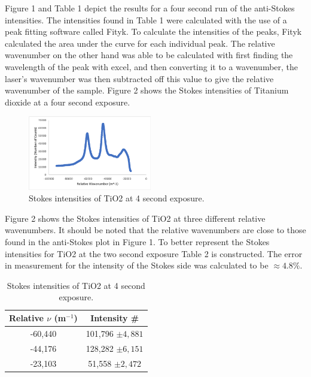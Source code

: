 \documentclass[twocolumn]{article}
\begin{document}
\newline
Figure 1 and Table 1 depict the results for a four second run of the anti-Stokes intensities. The intensities found in Table 1 were calculated with the use of a peak fitting software called Fityk. To calculate the intensities of the peaks, Fityk calculated the area under the curve for each individual peak. The relative wavenumber on the other hand was able to be calculated with first finding the wavelength of the peak with excel, and then converting it to a wavenumber, the laser's wavenumber was then subtracted off this value to give the relative wavenumber of the sample. Figure 2 shows the Stokes intensities of Titanium dioxide at a four second exposure.
\begin{figure}[htb]
\centering
\includegraphics[width=0.48\textwidth]{Figures/PHYS 331 RS TiO2 Stokes Relative Wavenumber (4 Sec).png}
\caption{Stokes intensities of TiO2 at 4 second exposure.}
\label{s_ti_2sec}
\end{figure}
\newline
Figure 2 shows the Stokes intensities of TiO2 at three different relative wavenumbers. It should be noted that the relative wavenumbers are close to those found in the anti-Stokes plot in Figure 1. To better represent the Stokes intensities for TiO2 at the two second exposure Table 2 is constructed. The error in measurement for the intensity of the Stokes side was calculated to be $\approx 4.8\%$.
\begin{table}[htb]
\begin{center}
\begin{tabular}{|c|c|}
    \hline \textbf{Relative $\nu$ (m$^{-1}$)} & \textbf{Intensity \#} \\ \hline
    -60,440 & 101,796 $\pm 4,881$ \\ \hline
    -44,176 & 128,282 $\pm 6,151$ \\ \hline
    -23,103 & 51,558 $\pm 2,472$ \\ \hline
\end{tabular}
\caption{Stokes intensities of TiO2 at 4 second exposure.}
\end{center}
\label{default}
\end{table}%
\end{document}
